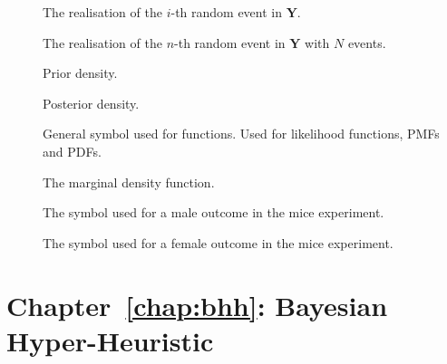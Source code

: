 \begin{description}
	\item [\parbox{2cm}{$y_{i}$}] The realisation of the $i$-th random event in $\boldsymbol{Y}$.
	\item [\parbox{2cm}{$y_{n}$}] The realisation of the $n$-th random event in $\boldsymbol{Y}$ with $N$ events.
	\item [\parbox{2cm}{$g$}] Prior density.
	\item [\parbox{2cm}{$g^{*}$}] Posterior density.
	\item [\parbox{2cm}{$f$}] General symbol used for functions. Used for likelihood functions, \acp{PMF} and \acp{PDF}.
	\item [\parbox{2cm}{$m$}] The marginal density function.
	\item [\parbox{2cm}{$M$}] The symbol used for a male outcome in the mice experiment.
	\item [\parbox{2cm}{$F$}] The symbol used for a female outcome in the mice experiment.
\end{description}

\section{Chapter~\ref{chap:bhh}: Bayesian Hyper-Heuristic}
\label{sec:symbols:bhh}

